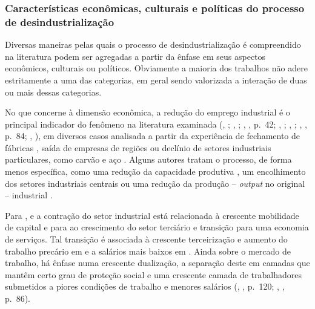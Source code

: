\subsubsection{Características econômicas, culturais e políticas do processo de desindustrialização}

Diversas maneiras pelas quais o processo de desindustrialização é
compreendido na literatura podem ser agregadas a partir da ênfase em
seus aspectos econômicos, culturais ou políticos. Obviamente a maioria
dos trabalhos não adere estritamente a uma das categorias, em geral
sendo valorizada a interação de duas ou mais dessas categorias.

No que concerne à dimensão econômica, a redução do emprego industrial é
o principal indicador do fenômeno na literatura examinada
(\citeauthor{beatty_long_2020}, \citeyear{beatty_long_2020}; \citeauthor{berger_industrial_2022}, \citeyear{berger_industrial_2022}; \citeauthor{clark_voices_2020}, \citeyear{clark_voices_2020}, p.~42; \citeauthor{phillips_deindustrialization_2019}, \citeyear{phillips_deindustrialization_2019}; \citeauthor{scheiring_left_2020}, \citeyear{scheiring_left_2020}; \citeauthor{tomlinson_-industrialization_2016}, \citeyear{tomlinson_-industrialization_2016}, p.~84; \citeauthor{van_nederveen_meerkerk_challenging_2017}, \citeyear{van_nederveen_meerkerk_challenging_2017}), em diversos casos analisada a partir da
experiência de fechamento de fábricas
\citep{clarke_closing_2015,hodson_titanic_2019,lewis_regenerating_2016}, saída de empresas de regiões
\citep{highsmith_beyond_2014} ou
declínio de setores industriais particulares, como carvão e aço
\citep{berger_burdens_2017}. Alguns autores tratam o processo, de forma menos
específica, como uma redução da capacidade produtiva
\citep{bluestone_deindustrialization_1982}, um encolhimento dos setores industriais centrais
\citep{durazzi_social_2020} ou uma redução da produção -- \emph{output} no original --
industrial \citep[p.~1219--1220]{van_nederveen_meerkerk_challenging_2017}.

Para \citet{bluestone_deindustrialization_1982}, \citet[p.~1]{kollmeyer_trade_2018} e \citet[p.~40]{clark_voices_2020}
a contração do setor industrial está relacionada à crescente mobilidade
de capital e para \citet[p.~199]{tomlinson_-industrialization_2016,tomlinson_-industrialization_2020}
ao crescimento do setor terciário e transição para uma economia de
serviços. Tal transição é associada à crescente terceirização e aumento
do trabalho precário em \citet[p.~79]{lee_institutional_2016} e a
salários mais baixos em \citet[p.~107]{winant_hard_2019}. Ainda
sobre o mercado de trabalho, há ênfase numa crescente dualização, a
separação deste em camadas que mantêm certo grau de proteção social e
uma crescente camada de trabalhadores submetidos a piores condições de
trabalho e menores salários
(\citeauthor{durazzi_social_2020}, \citeyear{durazzi_social_2020}, p.~120; \citeauthor{lee_institutional_2016}, \citeyear{lee_institutional_2016}, p.~86).

